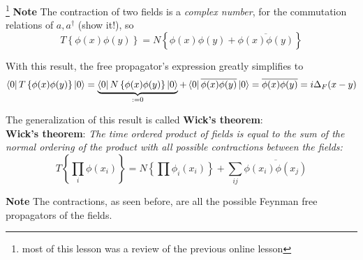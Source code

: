 
\footnote{
most of this lesson was a review of the previous online lesson
}
\textbf{Note} The contraction of two fields is a \textit{complex number}, for the
commutation relations of $a,a^\dagger$ (show it!), so
$$\boxed{T\left\{\phi(x)\phi(y)\right\} = N\left\{\phi(x)\phi(y)+
\overline{\phi(x)\phi(y)}\right\}}$$

With this result, the free propagator's expression greatly simplifies to
$$\bra{0}T\left\{\phi(x)\phi(y)\right\}\ket{0}=
\underbrace{\bra{0}N\left\{\phi(x)\phi(y)\right\}\ket{0}}_{:=0}+
\bra{0}\overline{\phi(x)\phi(y)}\ket{0} = \overline{\phi(x)\phi(y)}=
i\Delta_F(x-y)$$

The generalization of this result is called \textbf{Wick's theorem}:\\
\textbf{Wick's theorem}: \textit{The time ordered product of fields is
equal to the sum of the normal ordering of the product with all possible
contractions between the fields:}
$$T\left\{\prod_{i}\phi(x_i)\right\} = N\left\{\prod\phi_i(x_i)\right\}+
\sum_{ij}\overline{\phi(x_i)\phi(x_j)}$$


\textbf{Note} The contractions, as seen before, are all the possible Feynman
free propagators of the fields.

